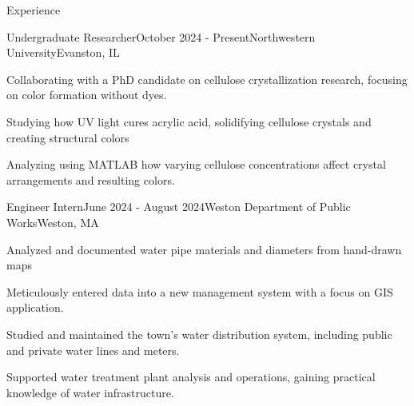 \documentclass[
	a4paper, %
	9pt, %
]{resume} %
\begin{document}
\begin{rSection}{Experience}

	\begin{rSubsection}{Undergraduate Researcher}{October 2024 - Present}{Northwestern University}{Evanston, IL}
		\item Collaborating with a PhD candidate on cellulose crystallization research, focusing on color formation without dyes.
		\item Studying how UV light cures acrylic acid, solidifying cellulose crystals and creating structural colors
		\item Analyzing using MATLAB how varying cellulose concentrations affect crystal arrangements and resulting colors.
	\end{rSubsection}



	\begin{rSubsection}{Engineer Intern}{June 2024 - August 2024}{Weston Department of Public Works}{Weston, MA}
		\item Analyzed and documented water pipe materials and diameters from hand-drawn maps
		\item Meticulously entered data into a new management system with a focus on GIS application.
		\item Studied and maintained the town’s water distribution system, including public and private water lines and meters.
		\item Supported water treatment plant analysis and operations, gaining practical knowledge of water infrastructure.
	\end{rSubsection}



\end{rSection}
\end{document}
